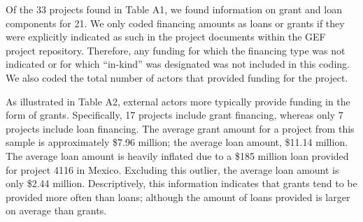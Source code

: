 \documentclass{article}
\begin{document}
Of the 33 projects found in Table A1, we found information on grant and loan components for 21. We only coded financing amounts as loans or grants if they were explicitly indicated as such in the project documents within the GEF project repository. Therefore, any funding for which the financing type was not indicated or for which “in-kind” was designated was not included in this coding. We also coded the total number of actors that provided funding for the project.  

As illustrated in Table A2, external actors more typically provide funding in the form of grants. Specifically, 17 projects include grant financing, whereas only 7 projects include loan financing. The average grant amount for a project from this sample is approximately \$7.96 million; the average loan amount, \$11.14 million. The average loan amount is heavily inflated due to a \$185 million loan provided for project 4116 in Mexico. Excluding this outlier, the average loan amount is only \$2.44 million. Descriptively, this information indicates that grants tend to be provided more often than loans; although the amount of loans provided is larger on average than grants. 
\end{document}
